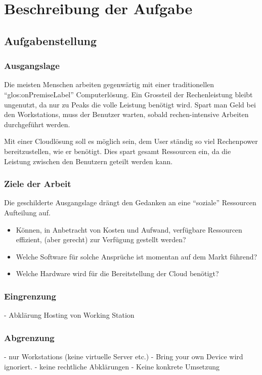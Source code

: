 \chapter{Beschreibung der Aufgabe}

\section{Aufgabenstellung}


\subsection{Ausgangslage}
Die meisten Menschen arbeiten gegenwärtig mit einer traditionellen "`\gls{glos:onPremiseLabel}"' Computerlösung.
Ein Grossteil der Rechenleistung bleibt ungenutzt, da nur zu Peaks die volle Leistung benötigt wird.
Spart man Geld bei den Workstations, muss der Benutzer warten, sobald rechen-intensive Arbeiten durchgeführt werden.

Mit einer Cloudlösung soll es möglich sein, dem User ständig so viel Rechenpower bereitzustellen, wie er benötigt.
Dies spart gesamt Ressourcen ein, da die Leistung zwischen den Benutzern geteilt werden kann.

\subsection{Ziele der Arbeit}
Die geschilderte Ausgangslage drängt den Gedanken an eine “soziale” Ressourcen Aufteilung auf.

\begin{itemize}
	\item Können, in Anbetracht von Kosten und Aufwand, verfügbare Ressourcen effizient, (aber gerecht) zur Verfügung gestellt werden?
	\item Welche Software für solche Ansprüche ist momentan auf dem Markt führend?
	\item Welche Hardware wird für die Bereitstellung der Cloud benötigt?
\end{itemize}


\subsection{Eingrenzung}
- Abklärung Hosting von Working Station

\subsection{Abgrenzung}
- nur Workstations (keine virtuelle Server etc.)
- Bring your own Device wird ignoriert.
- keine rechtliche Abklärungen
- Keine konkrete Umsetzung

